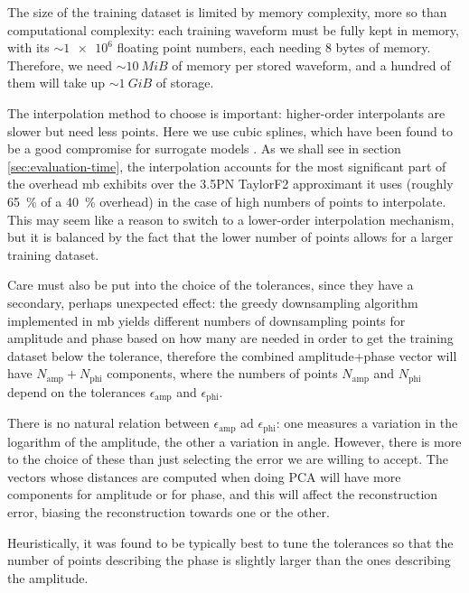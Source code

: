 \documentclass[main.tex]{subfiles}
\begin{document}
The size of the training dataset is limited by memory complexity, more so than computational complexity: each training waveform must be fully kept in memory, with its \(\sim \num{1e6}\) floating point numbers, each needing 8 bytes of memory. 
Therefore, we need \(\sim \SI{10}{MiB}\) of memory per stored waveform, and a hundred of them will take up \( \sim \SI{1}{GiB}\) of storage. 

The interpolation method to choose is important: higher-order interpolants are slower but need less points.
Here we use cubic splines, which have been found to be a good compromise for surrogate models \cite{lackeySurrogateModelAlignedspin2019}.
As we shall see in section \ref{sec:evaluation-time}, the interpolation accounts for the most significant part of the overhead \ac{mb} exhibits over the 3.5PN TaylorF2 approximant it uses (roughly \SI{65}{\percent} of a \SI{40}{\percent} overhead) in the case of high numbers of points to interpolate. 
This may seem like a reason to switch to a lower-order interpolation mechanism, but it is balanced by the fact that the lower number of points allows for a larger training dataset. 

Care must also be put into the choice of the tolerances, since they have a secondary, perhaps unexpected effect: the greedy downsampling algorithm implemented in \ac{mb} yields different numbers of downsampling points for amplitude and phase based on how many are needed in order to get the training dataset below the tolerance, therefore the combined amplitude+phase vector will have \(N _{\text{amp}} + N _{\text{phi}}\) components, where the numbers of points \(N _{\text{amp}}\) and \(N _{\text{phi}}\) depend on the tolerances \( \epsilon _{\text{amp}}\) and \(\epsilon _{\text{phi}}\). 

There is no natural relation between \(\epsilon _{\text{amp}}\) ad \(\epsilon _{\text{phi}}\): one measures a variation in the logarithm of the amplitude, the other a variation in angle. 
However, there is more to the choice of these than just selecting the error we are willing to accept. 
The vectors whose distances are computed when doing \ac{PCA} will have more components for amplitude or for phase, and this will affect the reconstruction error, biasing the reconstruction towards one or the other. 

Heuristically, it was found to be typically best to tune the tolerances so that the number of points describing the phase is slightly larger than the ones describing the amplitude. 
\end{document}
